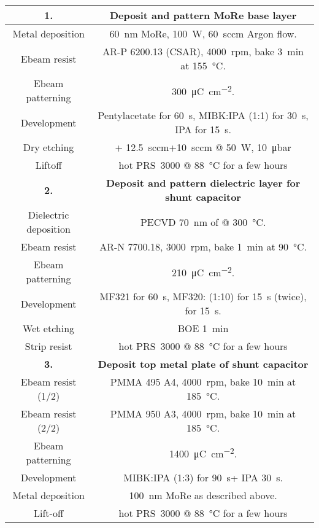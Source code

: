 \begin{tabular}{cc}
	\hline \hline
	\textbf{1.} & \textbf{Deposit and pattern MoRe base layer} \\
	\hline 
	Metal deposition & \SI{60}{\nano\meter} MoRe, \SI{100}{\watt}, \SI{60}{sccm} Argon flow. \\
	Ebeam resist & AR-P 6200.13 (CSAR), \SI{4000}{rpm}, bake \SI{3}{\minute} at \SI{155}{\celsius}. \\
	Ebeam patterning & \SI{300}{\micro\coulomb\per\centi\meter\squared}. \\
	Development & Pentylacetate for \SI{60}{\second}, MIBK:IPA (1:1) for \SI{30}{\second}, IPA for \SI{15}{\second}. \\
	Dry etching & \ce{SF6}+\ce{He} \SI{12.5}{sccm}+\SI{10}{sccm} @ \SI{50}{\watt}, \SI{10}{\micro\bar} \\
	Liftoff & hot PRS~3000 @ \SI{88}{\celsius} for a few hours \\
	\hline
	
	\textbf{2.} & \textbf{Deposit and pattern dielectric layer for shunt capacitor} \\
	\hline 
	Dielectric deposition & PECVD \SI{70}{\nano\meter} of \ce{Si3N4} @ \SI{300}{\celsius}. \\
	Ebeam resist & AR-N 7700.18, \SI{3000}{rpm}, bake \SI{1}{\minute} at \SI{90}{\celsius}. \\
	Ebeam patterning & \SI{210}{\micro\coulomb\per\centi\meter\squared}. \\
	Development & MF321 for \SI{60}{\second}, MF320:\ce{H2O} (1:10) for \SI{15}{\second} (twice), \ce{H2O} for \SI{15}{\second}. \\
	Wet etching & BOE \SI{1}{\minute} \\
	Strip resist & hot PRS~3000 @ \SI{88}{\celsius} for a few hours \\
	\hline
	
	\textbf{3.} & \textbf{Deposit top metal plate of shunt capacitor} \\
	\hline 
	Ebeam resist (1/2) & PMMA 495 A4, \SI{4000}{rpm}, bake \SI{10}{\minute} at \SI{185}{\celsius}. \\
	Ebeam resist (2/2) & PMMA 950 A3, \SI{4000}{rpm}, bake \SI{10}{\minute} at \SI{185}{\celsius}. \\
	Ebeam patterning & \SI{1400}{\micro\coulomb\per\centi\meter\squared}. \\
	Development & MIBK:IPA (1:3) for \SI{90}{\second}+ IPA \SI{30}{\second}. \\
	Metal deposition & \SI{100}{\nano\meter} MoRe as described above. \\
	Lift-off & hot PRS~3000 @ \SI{88}{\celsius} for a few hours \\
	\hline\hline
\end{tabular}

